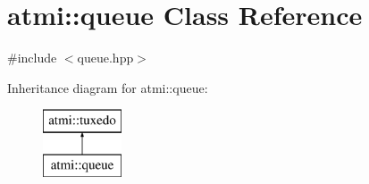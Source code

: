 \hypertarget{classatmi_1_1queue}{\section{atmi\+:\+:queue Class Reference}
\label{classatmi_1_1queue}
}


{\ttfamily \#include $<$queue.\+hpp$>$}

Inheritance diagram for atmi\+:\+:queue\+:\begin{figure}[H]
\begin{center}
\leavevmode
\includegraphics[height=2.000000cm]{classatmi_1_1queue}
\end{center}
\end{figure}
